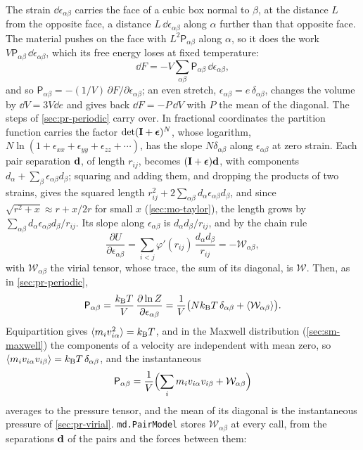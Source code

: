 The strain $\dd\epsilon_{\alpha\beta}$ carries the face of a cubic box
normal to $\beta$, at the distance $L$ from the opposite face, a distance
$L\,\dd\epsilon_{\alpha\beta}$ along $\alpha$ further than that opposite
face. The material pushes on the face with $L^2\mathsf{P}_{\alpha\beta}$
along $\alpha$, so it does the work $V\mathsf{P}_{\alpha\beta}\,
\dd\epsilon_{\alpha\beta}$, which its free energy loses at fixed
temperature:
\begin{equation*}
   \dd F = -V\sum_{\alpha\beta}\mathsf{P}_{\alpha\beta}\,
   \dd\epsilon_{\alpha\beta} ,
\end{equation*}
and so $\mathsf{P}_{\alpha\beta} = -(1/V)\,\partial F/\partial
\epsilon_{\alpha\beta}$; an even stretch, $\epsilon_{\alpha\beta} =
e\,\delta_{\alpha\beta}$, changes the volume by $\dd V = 3V\dd e$ and gives
back $\dd F = -P\,\dd V$ with $P$ the mean of the diagonal. The steps of
\cref{sec:pr-periodic} carry over. In fractional coordinates the
partition function carries the factor $\det(\bm{\mathrm{I}} +
\boldsymbol{\epsilon})^N$, whose logarithm, $N\ln(1 + \epsilon_{xx} +
\epsilon_{yy} + \epsilon_{zz} + \dotsb)$, has the slope
$N\delta_{\alpha\beta}$ along $\epsilon_{\alpha\beta}$ at zero strain. Each
pair separation $\bm{\mathrm{d}}$, of length $r_{ij}$, becomes $(\bm{\mathrm{I}} +
\boldsymbol{\epsilon})\bm{\mathrm{d}}$, with components $d_\alpha +
\sum_\beta\epsilon_{\alpha\beta}d_\beta$; squaring and adding them, and
dropping the products of two strains, gives the squared length $r_{ij}^2 +
2\sum_{\alpha\beta}d_\alpha\epsilon_{\alpha\beta}d_\beta$, and since
$\sqrt{r^2 + x} \approx r + x/2r$ for small $x$ (\cref{sec:mo-taylor}),
the length grows by $\sum_{\alpha\beta}d_\alpha\epsilon_{\alpha\beta}
d_\beta/r_{ij}$. Its slope along $\epsilon_{\alpha\beta}$ is $d_\alpha
d_\beta/r_{ij}$, and by the chain rule
\begin{equation*}
   \frac{\partial U}{\partial\epsilon_{\alpha\beta}}
   = \sum_{i<j}\varphi'(r_{ij})\,\frac{d_\alpha d_\beta}{r_{ij}}
   = -\mathcal{W}_{\alpha\beta} ,
\end{equation*}
with $\mathcal{W}_{\alpha\beta}$ the virial tensor, whose trace, the sum of
its diagonal, is $\mathcal{W}$. Then, as in \cref{sec:pr-periodic},
\begin{equation*}
   \mathsf{P}_{\alpha\beta} = \frac{k_{\mathrm{B}} T}{V}\,
   \frac{\partial\ln Z}{\partial\epsilon_{\alpha\beta}}
   = \frac1V\bigl(Nk_{\mathrm{B}} T\,\delta_{\alpha\beta}
   + \langle \mathcal{W}_{\alpha\beta} \rangle\bigr) .
\end{equation*}
Equipartition gives $\langle m_iv_{i\alpha}^2 \rangle = k_{\mathrm{B}} T$, and in the Maxwell
distribution (\cref{sec:sm-maxwell}) the components of a velocity are
independent with mean zero, so $\langle m_iv_{i\alpha}v_{i\beta} \rangle = k_{\mathrm{B}} T\,
\delta_{\alpha\beta}$, and the instantaneous
\begin{equation}
   \mathsf{P}_{\alpha\beta} = \frac1V\Bigl(\sum_im_iv_{i\alpha}v_{i\beta}
   + \mathcal{W}_{\alpha\beta}\Bigr)
   \label{eq:pr-tensor}
\end{equation}
averages to the pressure tensor, and the mean of its diagonal is the
instantaneous pressure of \cref{sec:pr-virial}. \texttt{md.PairModel}
stores $\mathcal{W}_{\alpha\beta}$ at every call, from the separations
$\bm{\mathrm{d}}$ of the pairs and the forces between them:


